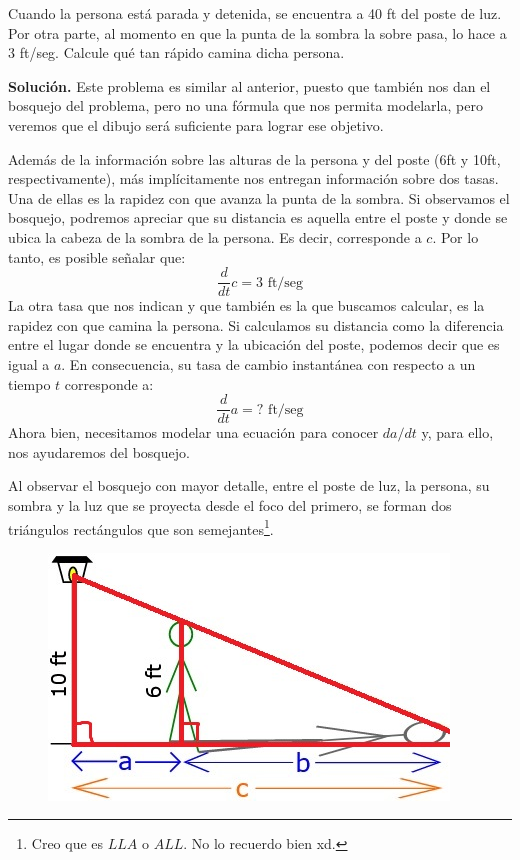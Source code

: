 \documentclass[12pt]{article}
\begin{document}
Cuando la persona está parada y detenida, se encuentra a 40 ft del poste de luz. Por otra parte, al momento en que la punta de la sombra la sobre pasa, lo hace a 3 ft/seg. Calcule qué tan rápido camina dicha persona.

\textbf{Solución.} \quad Este problema es similar al anterior, puesto que también nos dan el bosquejo del problema, pero no una fórmula que nos permita modelarla, pero veremos que el dibujo será suficiente para lograr ese objetivo.

Además de la información sobre las alturas de la persona y del poste (6ft y 10ft, respectivamente), más implícitamente nos entregan información sobre dos tasas. Una de ellas es la rapidez con que avanza la punta de la sombra. Si observamos el bosquejo, podremos apreciar que su distancia es aquella entre el poste y donde se ubica la cabeza de la sombra de la persona. Es decir, corresponde a $c$. Por lo tanto, es posible señalar que:
\[
	\frac{d}{dt}c = 3 \text{ ft/seg}
\]
La otra tasa que nos indican y que también es la que buscamos calcular, es la rapidez con que camina la persona. Si calculamos su distancia como la diferencia entre el lugar donde se encuentra y la ubicación del poste, podemos decir que es igual a $a$. En consecuencia, su tasa de cambio instantánea con respecto a un tiempo $t$ corresponde a:
\[
	\frac{d}{dt}a = \text{? ft/seg}
\]
Ahora bien, necesitamos modelar una ecuación para conocer $da/dt$ y, para ello, nos ayudaremos del bosquejo.

Al observar el bosquejo con mayor detalle, entre el poste de luz, la persona, su sombra y la luz que se proyecta desde el foco del primero, se forman dos triángulos rectángulos que son semejantes\footnote{Creo que es $LLA$ o $ALL$. No lo recuerdo bien xd.}.

\begin{figure}[hbt!]
\centering
\includegraphics[scale=0.6]{img/related-prob-3b.jpg}
\end{figure}
\end{document}
